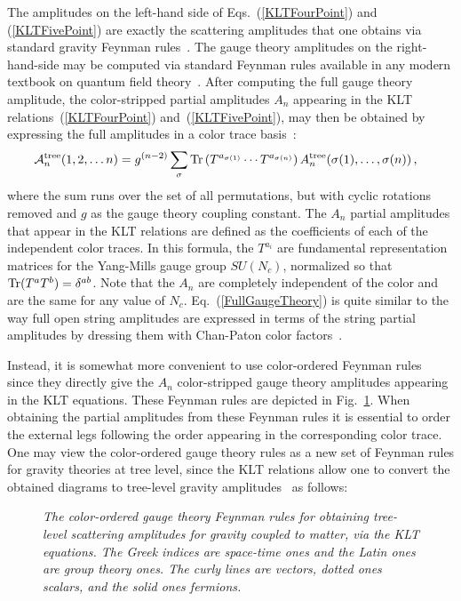 The amplitudes on the left-hand side of Eqs.~(\ref{KLTFourPoint}) and
(\ref{KLTFivePoint}) are exactly the scattering amplitudes that one
obtains via standard gravity Feynman
rules~\cite{DeWitt67A,DeWitt67B,VeltmanGravity}.  The gauge theory
amplitudes on the right-hand-side may be computed via standard Feynman
rules available in any modern textbook on quantum field
theory~\cite{Peskin95,Weinberg95}.  After computing the full gauge
theory amplitude, the color-stripped partial amplitudes $A_n$
appearing in the KLT relations~(\ref{KLTFourPoint})
and~(\ref{KLTFivePoint}), may then be obtained by expressing the
full amplitudes in a color trace
basis~\cite{Berends87,Kosower88,Mangano88,ManganoReview,TasiLance}:
%
\begin{equation}
{\cal A}_n^{\rm tree} (1,2,\ldots n) = 
 g^{(n-2)}  \sum_{\sigma } 
{\rm Tr}\left( T^{a_{\sigma(1)}} 
\cdots  T^{a_{\sigma(n)}} \right)
 A_n^{\rm tree}(\sigma(1), \ldots, \sigma(n)) \,, \hskip .3 cm 
\label{FullGaugeTheory}
\end{equation}
%
where the sum runs over the set of all permutations, but with cyclic
rotations removed and $g$ as the gauge theory coupling constant.  The
$A_n$ partial amplitudes that appear in the KLT relations are defined
as the coefficients of each of the independent color traces. In this
formula, the $T^{a_i}$ are fundamental representation matrices for the
Yang-Mills gauge group $SU(N_c)$, normalized so that ${\rm Tr}(T^aT^b)
= \delta^{ab}$. Note that the $A_n$ are completely independent of the
color and are the same for any value of $N_c$.
Eq.~(\ref{FullGaugeTheory}) is quite similar to the way full open
string amplitudes are expressed in terms of the string partial
amplitudes by dressing them with Chan-Paton color
factors~\cite{ChanPaton}.

Instead, it is somewhat more convenient to use color-ordered Feynman
rules~\cite{ManganoReview,TasiLance,Review} since they directly give
the $A_n$ color-stripped gauge theory amplitudes appearing in the KLT
equations.  These Feynman rules are depicted in
Fig.~\ref{figure:Rules}.  When obtaining the partial amplitudes from
these Feynman rules it is essential to order the external legs
following the order appearing in the corresponding color trace.
One may view the color-ordered gauge theory rules as a new set of
Feynman rules for gravity theories at tree level, since the KLT
relations allow one to convert the obtained diagrams to tree-level
gravity amplitudes~\cite{Square} as follows:

\begin{figure}[h]
  \def\epsfsize#1#2{0.8#1} \centerline{}
  \caption{\it The color-ordered gauge theory Feynman rules for
  obtaining tree-level scattering amplitudes for gravity coupled to matter, via
  the KLT equations. The Greek indices are space-time ones and the
  Latin ones are group theory ones.  The curly lines are vectors,
  dotted ones scalars, and the solid ones fermions.}
  \label{figure:Rules}
\end{figure}

